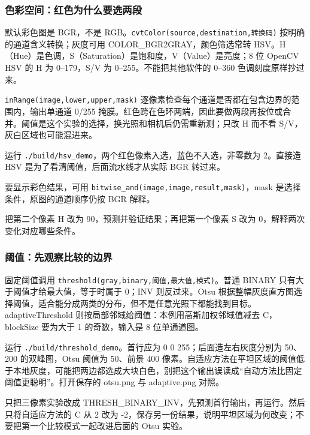 \subsubsection{色彩空间：红色为什么要选两段}
默认彩色图是 BGR，不是 RGB。\texttt{cvtColor(source,destination,转换码)} 按明确的通道含义转换；灰度可用 COLOR\_BGR2GRAY，颜色筛选常转 HSV。H（Hue）是色调，S（Saturation）是饱和度，V（Value）是亮度；8 位 OpenCV HSV 的 H 为 0--179，S/V 为 0--255。不能把其他软件的 0--360 色调刻度原样抄过来。

\texttt{inRange(image,lower,upper,mask)} 逐像素检查每个通道是否都在包含边界的范围内，输出单通道 0/255 掩膜。红色跨在色环两端，因此要做两段再按位或合并。阈值是这个实验的选择，换光照和相机后仍需重新测；只改 H 而不看 S/V，灰白区域也可能混进来。
\begin{example}[先用三个像素确认条件]
运行 \texttt{./build/hsv\_demo}，两个红色像素入选，蓝色不入选，非零数为 2。直接造 HSV 是为了看清阈值，后面流水线才从实际 BGR 转过来。
\begin{cvblock}

\end{cvblock}
要显示彩色结果，可用 \texttt{bitwise\_and(image,image,result,mask)}，mask 是选择条件，原图的通道顺序仍按 BGR 解释。
\end{example}
\begin{exercise}\label{ex:v2-cv-hsv}
把第二个像素 H 改为 90，预测并验证结果；再把第一个像素 S 改为 0，解释两次变化对应哪些条件。
\end{exercise}

\subsubsection{阈值：先观察比较的边界}
固定阈值调用 \texttt{threshold(gray,binary,阈值,最大值,模式)}。普通 BINARY 只有大于阈值才给最大值，等于时属于 0；INV 则反过来。Otsu 根据整幅灰度直方图选择阈值，适合能分成两类的分布，但不是任意光照下都能找到目标。adaptiveThreshold 则按局部邻域给阈值：本例用高斯加权邻域值减去 C，blockSize 要为大于 1 的奇数，输入是 8 位单通道图。
\begin{example}
运行 \texttt{./build/threshold\_demo}。首行应为 0 0 255；后面造左右灰度分别为 50、200 的双峰图，Otsu 阈值为 50、前景 400 像素。自适应方法在平坦区域的阈值低于本地灰度，可能把两边都选成大块白色，别把这个输出误读成“自动方法比固定阈值更聪明”。打开保存的 otsu.png 与 adaptive.png 对照。
\begin{cvblock}

\end{cvblock}
\end{example}
\begin{exercise}\label{ex:v2-cv-threshold}
只把三像素实验改成 THRESH\_BINARY\_INV，先预测首行输出，再运行。然后只将自适应方法的 C 从 2 改为 -2，保存另一份结果，说明平坦区域为何改变；不要把第一个比较模式一起改进后面的 Otsu 实验。
\end{exercise}

